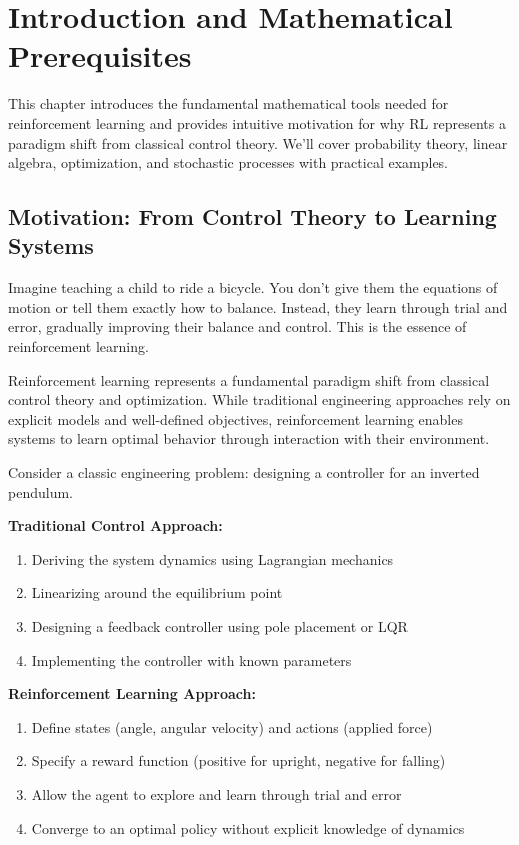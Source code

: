 \chapter{Introduction and Mathematical Prerequisites}
\label{ch:introduction}

\begin{keyideabox}
This chapter introduces the fundamental mathematical tools needed for reinforcement learning and provides intuitive motivation for why RL represents a paradigm shift from classical control theory. We'll cover probability theory, linear algebra, optimization, and stochastic processes with practical examples.
\end{keyideabox}

\section{Motivation: From Control Theory to Learning Systems}

\begin{intuitionbox}
Imagine teaching a child to ride a bicycle. You don't give them the equations of motion or tell them exactly how to balance. Instead, they learn through trial and error, gradually improving their balance and control. This is the essence of reinforcement learning.
\end{intuitionbox}

Reinforcement learning represents a fundamental paradigm shift from classical control theory and optimization. While traditional engineering approaches rely on explicit models and well-defined objectives, reinforcement learning enables systems to learn optimal behavior through interaction with their environment.

\begin{examplebox}
Consider a classic engineering problem: designing a controller for an inverted pendulum.

\textbf{Traditional Control Approach:}
\begin{enumerate}
    \item Deriving the system dynamics using Lagrangian mechanics
    \item Linearizing around the equilibrium point  
    \item Designing a feedback controller using pole placement or LQR
    \item Implementing the controller with known parameters
\end{enumerate}

\textbf{Reinforcement Learning Approach:}
\begin{enumerate}
    \item Define states (angle, angular velocity) and actions (applied force)
    \item Specify a reward function (positive for upright, negative for falling)
    \item Allow the agent to explore and learn through trial and error
    \item Converge to an optimal policy without explicit knowledge of dynamics
\end{enumerate}
\end{examplebox}


